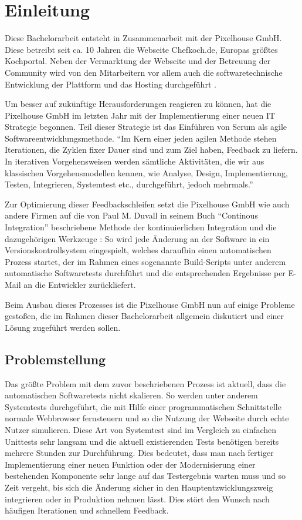 \section{Einleitung}

Diese Bachelorarbeit entsteht in Zusammenarbeit mit der Pixelhouse GmbH. Diese betreibt seit ca. 10 Jahren die Webseite Chefkoch.de, Europas größtes Kochportal. Neben der Vermarktung der Webseite und der Betreuung der Community wird von den Mitarbeitern vor allem auch die softwaretechnische Entwicklung der Plattform und das Hosting durchgeführt \citep[Vgl.][]{pixelhouse14}.

Um besser auf zukünftige Herausforderungen reagieren zu können, hat die Pixelhouse GmbH im letzten Jahr mit der Implementierung einer neuen IT Strategie begonnen. Teil dieser Strategie ist das Einführen von Scrum als agile Softwareentwicklungsmethode. "`Im Kern einer jeden agilen Methode stehen Iterationen, die Zyklen fixer Dauer sind und zum Ziel haben, Feedback zu liefern. In iterativen Vorgehensweisen werden sämtliche Aktivitäten, die wir aus klassischen Vorgehensmodellen kennen, wie Analyse, Design, Implementierung, Testen, Integrieren, Systemtest etc., durchgeführt, jedoch mehrmals."' \citep[S.][S. 18]{wintersteiger13}

Zur Optimierung dieser Feedbackschleifen setzt die Pixelhouse GmbH wie auch andere Firmen auf die von Paul M. Duvall in seinem Buch "`Continous Integration"' beschriebene Methode der kontinuierlichen Integration und die dazugehörigen Werkzeuge \citep[Vgl.][S. 12]{DuvMatAnd07}: So wird jede Änderung an der Software in ein Versionskontrollsystem eingespielt, welches daraufhin einen automatischen Prozess startet, der im Rahmen eines sogenannte Build-Scripts unter anderem automatische Softwaretests durchführt und die entsprechenden Ergebnisse per E-Mail an die Entwickler zurückliefert.

Beim Ausbau dieses Prozesses ist die Pixelhouse GmbH nun auf einige Probleme gestoßen, die im Rahmen dieser Bachelorarbeit allgemein diskutiert und einer Lösung zugeführt werden sollen.

\subsection{Problemstellung}

Das größte Problem mit dem zuvor beschriebenen Prozess ist aktuell, dass die automatischen Softwaretests nicht skalieren. So werden unter anderem Systemtests durchgeführt, die mit Hilfe einer programmatischen Schnittstelle normale Webbrowser fernsteuern und so die Nutzung der Webseite durch echte Nutzer simulieren. Diese Art von Systemtest sind im Vergleich zu einfachen Unittests sehr langsam und die aktuell existierenden Tests benötigen bereits mehrere Stunden zur Durchführung. Dies bedeutet, dass man nach fertiger Implementierung einer neuen Funktion oder der Modernisierung einer bestehenden Komponente sehr lange auf das Testergebnis warten muss und so Zeit vergeht, bis sich die Änderung sicher in den Hauptentzwicklungszweig integrieren oder in Produktion nehmen lässt. Dies stört den Wunsch nach häufigen Iterationen und schnellem Feedback.

